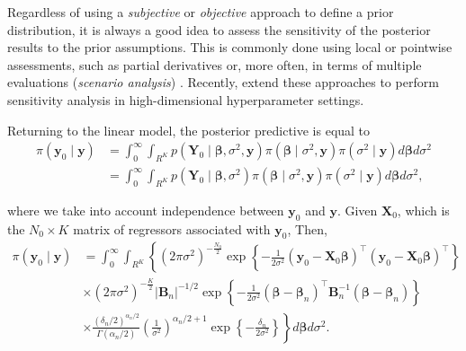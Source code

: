 Regardless of using a \textit{subjective} or \textit{objective} approach to define a prior distribution, it is always a good idea to assess the sensitivity of the posterior results to the prior assumptions. This is commonly done using local or pointwise assessments, such as partial derivatives \cite{giordano2022evaluating,Jacobi2022,gustafson2000local} or, more often, in terms of multiple evaluations (\textit{scenario analysis}) \cite{richardson1997bayesian, kim1999has, an2007bayesian}. Recently, \cite{jacobi2024posterior} extend these approaches to perform sensitivity analysis in high-dimensional hyperparameter settings. 

Returning to the linear model, the posterior predictive is equal to
\begin{align*}
	\pi({\bm{y}}_0\mid {\bm{y}})&=\int_{0}^{\infty}\int_{R^K}p({\bm{Y}}_0\mid \bm{\beta},\sigma^2,{\bm{y}})\pi(\bm{\beta}\mid \sigma^2,{\bm{y}})\pi(\sigma^2\mid {\bm{y}})d\bm{\beta} d\sigma^2\\
	&=\int_{0}^{\infty}\int_{R^K}p({\bm{Y}}_0\mid \bm{\beta},\sigma^2)\pi(\bm{\beta}\mid \sigma^2,{\bm{y}})\pi(\sigma^2\mid {\bm{y}})d\bm{\beta} d\sigma^2,
\end{align*}

where we take into account independence between ${\bm{y}}_0$ and ${\bm{y}}$. Given ${\bm{X}}_0$, which is the $N_0\times K$ matrix of regressors associated with ${\bm{y}}_0$, Then,
\begin{align*}
	\pi({\bm{y}}_0\mid {\bm{y}})&=\int_{0}^{\infty}\int_{R^K}\left\{ (2\pi\sigma^2)^{-\frac{N_0}{2}} \exp \left\{-\frac{1}{2\sigma^2} ({\bm{y}}_0 - {\bm{X}}_0\bm{\beta})^{\top}({\bm{y}}_0 - {\bm{X}}_0\bm{\beta})^{\top} \right\}\right. \\
	& \times (2\pi\sigma^2)^{-\frac{K}{2}} |{\bm{B}}_n|^{-1/2} \exp \left\{-\frac{1}{2\sigma^2} (\bm{\beta} - \bm{\beta}_n)^{\top}{\bm{B}}_n^{-1}(\bm{\beta} - \bm{\beta}_n)\right\} \\
	& \left. \times \frac{(\delta_n/2)^{\alpha_n/2}}{\Gamma(\alpha_n/2)}\left(\frac{1}{\sigma^2}\right)^{\alpha_n/2+1}\exp \left\{-\frac{\delta_n}{2\sigma^2} \right\}\right\}d\bm{\beta} d\sigma^2. \\
\end{align*}

